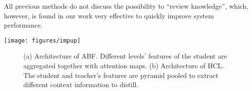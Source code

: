 \documentclass[final]{cvpr}
\begin{document}
All previous methods do not discuss the possibility to ``review knowledge'', which, however, is found in our work very effective to quickly improve system performance. 


\begin{figure*} [tb]
	\centering
	
	\begin{minipage}[t]{0.8\linewidth}
		\texttt{[image: figures/impup]}
	\end{minipage}	
	
	\hspace{0.4in}

	\hspace{0.4in}
	
	\caption{(a) Architecture for supervising one layer of the student according to the review mechanism. (b) Direct generalization from one layer to muliple ones. The process is straightforward but costly. (c) The architecture in (b) is optimized with fusion modules to obtain a compact framework. (d) We further improved the procudure in a progressive manner and utlize redisual learning as our final architecture. Structures of ABF and HCL are in Figure \ref{fig:detail}. This figure is best viewed in color.}
	\label{fig:imp}
\end{figure*}



\begin{figure} [tb]
	\centering
	
	\hspace{0.01in}
\caption{(a) Architecture of ABF. Different levels' features of the student are aggregated together with attention maps. (b) Architecture of HCL. The student and teacher's features are pyramid pooled to extract different context information to distill. }
	\label{fig:detail}
	\vspace{-0.1in}
\end{figure}
\end{document}
